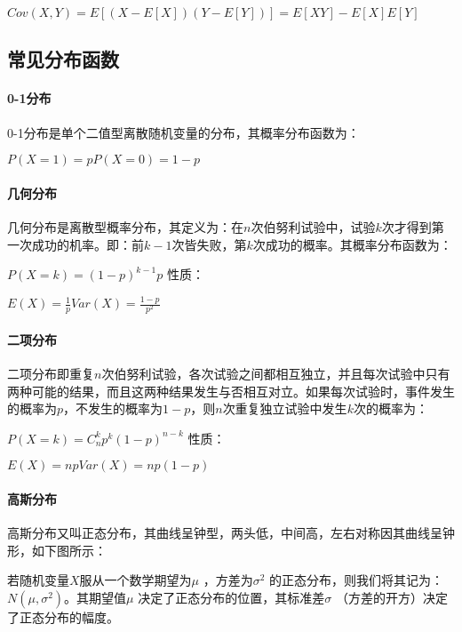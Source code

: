\documentclass[11pt]{book}
\newcounter{#2}
\newcounter{#2}[#1]
\numberwithin{#2}{#1}
\begin{document}
$ Cov\left( X,Y \right) =E\left[ \left( X-E\left[ X \right]  \right) \left( Y-E\left[ Y \right]  \right) \right] =E\left[ XY \right] -E\left[ X \right] E\left[ Y \right] $ 

\subsection{常见分布函数}

\paragraph{0-1分布}

0-1分布是单个二值型离散随机变量的分布，其概率分布函数为：

$ P\left( X=1 \right) =pP\left( X=0 \right) =1-p $
\paragraph{几何分布}

几何分布是离散型概率分布，其定义为：在$ n $次伯努利试验中，试验$ k $次才得到第一次成功的机率。即：前$ k-1 $次皆失败，第$ k $次成功的概率。其概率分布函数为：

$ P\left( X=k \right) =\left( 1-p \right) ^{k-1} p $
性质：

$ E\left( X \right) =\frac{1}{p} Var\left( X \right) =\frac{1-p}{p^{2} }  $
\paragraph{二项分布}

二项分布即重复$ n $次伯努利试验，各次试验之间都相互独立，并且每次试验中只有两种可能的结果，而且这两种结果发生与否相互对立。如果每次试验时，事件发生的概率为$ p $，不发生的概率为$ 1-p $，则$ n $次重复独立试验中发生$ k $次的概率为：

$ P\left( X=k \right) =C_{n}^{k} p^{k} \left( 1-p \right) ^{n-k}  $
性质：

$ E\left( X \right) =npVar\left( X \right) =np\left( 1-p \right)  $

\paragraph{高斯分布}

高斯分布又叫正态分布，其曲线呈钟型，两头低，中间高，左右对称因其曲线呈钟形，如下图所示：


若随机变量$ X $服从一个数学期望为$ \mu $ ，方差为$ \sigma ^{2} $ 的正态分布，则我们将其记为：$ N\left( \mu ,\sigma^{2}  \right)  $。其期望值$ \mu $ 决定了正态分布的位置，其标准差$ \sigma $ （方差的开方）决定了正态分布的幅度。
\end{document}

